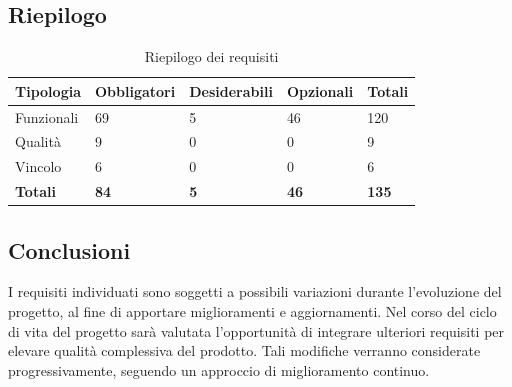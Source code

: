 ﻿\documentclass[a4paper,12pt]{article}
\begin{document}
{  \subsection{Riepilogo}{
      \begin{table}[H]
          \centering
          \begin{tabular}{|l|l|l|l|l|}
              \hline
              \rowcolor{gold}
              \textbf{Tipologia} & \textbf{Obbligatori} & \textbf{Desiderabili} & \textbf{Opzionali} & \textbf{Totali} \\
              \hline
              Funzionali         & 69                   & 5                     & 46                 & 120             \\
              \hline
              Qualità            & 9                    & 0                     & 0                  & 9               \\
              \hline
              Vincolo            & 6                    & 0                     & 0                  & 6               \\
              \hline
              \textbf{Totali}    & \textbf{84}          & \textbf{5}            & \textbf{46}        & \textbf{135 }    \\
              \hline
          \end{tabular}
          \caption{Riepilogo dei requisiti}
          \label{tab:riepilogo-requisiti}
      \end{table}
  }

  \subsection{Conclusioni}{
      I requisiti individuati sono soggetti a possibili variazioni durante l'evoluzione del progetto, al fine di apportare miglioramenti e aggiornamenti. Nel corso del ciclo di vita del progetto sarà valutata l'opportunità di integrare ulteriori requisiti per elevare qualità complessiva del prodotto. Tali modifiche verranno considerate progressivamente, seguendo un approccio di miglioramento continuo.
  }
 }
\end{document}
